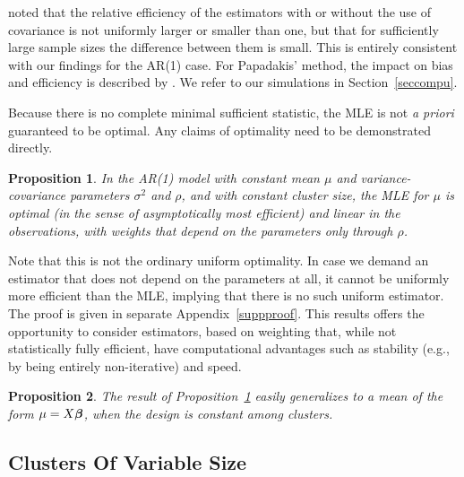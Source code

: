 \documentclass[11pt,a5paper,twoside]{book}
\newtheorem{proposition}{Proposition}[chapter]
\newcommand{\bfbeta}{\mbox{\boldmath $\beta$}}
\begin{document}
\citet[p.~172]{CB48}  noted that the relative efficiency of the estimators with or without the use of covariance is not uniformly larger or smaller than one, but that for sufficiently large sample sizes the difference between them is small. This is entirely consistent with our findings for the AR(1) case. For Papadakis' method, the impact on bias and efficiency is described by \cite{M06}. We refer to our simulations in Section~\ref{seccompu}.

Because there is no complete minimal sufficient statistic, the MLE is not {\em a priori\/} guaranteed to be optimal. Any claims of optimality need to be demonstrated directly.
\begin{proposition}
\label{prop1}
In the AR(1) model with constant mean $\mu$ and variance-covariance parameters $\sigma^2$ and $\rho$, and with constant cluster size, the MLE for $\mu$ is optimal (in the sense of asymptotically most efficient) and linear in the observations, with weights that depend on the parameters only through $\rho$.
\end{proposition}
Note that this is not the ordinary uniform optimality. In case we demand an estimator that does not depend on the parameters at all, it cannot be uniformly more efficient than the MLE, implying that there is no such uniform estimator. The proof is given in separate Appendix~\ref{suppproof}. This results offers the opportunity to consider estimators, based on weighting that, while not statistically fully efficient, have computational advantages such as stability (e.g., by being entirely non-iterative) and speed. 

\begin{proposition}
The result of Proposition~\ref{prop1} easily generalizes to a mean of the form $\mathbf{\mu}=X\bfbeta$, when the design is constant among clusters.\end{proposition}


\subsection{Clusters Of Variable Size}
\label{secvariable}
\end{document}
